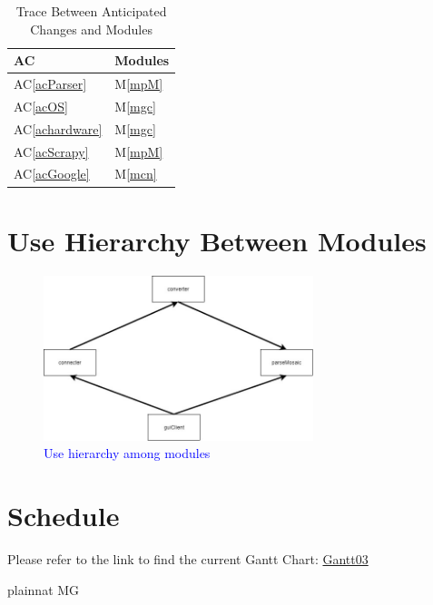 \documentclass[12pt, titlepage]{article}
\newcommand{\acref}[1]{AC\ref{#1}}
\newcommand{\mref}[1]{M\ref{#1}}
\begin{document}
\begin{table}[H]
\centering
\begin{tabular}{p{} p{}}
\toprule
\textbf{AC} & \textbf{Modules}\\
\midrule
\acref{acParser} & \mref{mpM}\\
\acref{acOS} & \mref{mgc}\\
\acref{achardware} & \mref{mgc}\\
\acref{acScrapy} & \mref{mpM}\\
\acref{acGoogle} & \mref{mcn}\\
\bottomrule
\end{tabular}
\caption{Trace Between Anticipated Changes and Modules}
\label{TblACT}
\end{table}

\color{blue}
\section{Use Hierarchy Between Modules} \label{SecUse}

\begin{figure}[H]
\centering
\includegraphics[width=0.7\textwidth]{uh.jpg}
\caption{\textcolor{blue}{Use hierarchy among modules}}
\label{FigUH}
\end{figure}
\color{black}
\section{Schedule}
Please refer to the link to find the current Gantt Chart:
\color{blue}
\href{https://gitlab.cas.mcmaster.ca/liangw15/3XA3Project/blob/working/ProjectSchedule/Group12_Gantt03.pdf}{ Gantt03}

\color{black}


 {plainnat}
 {MG}
\end{document}
